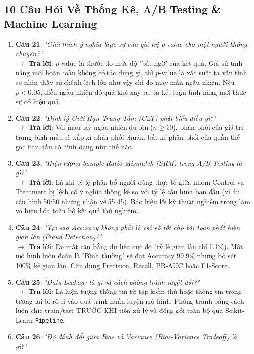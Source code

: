 \subsection{10 Câu Hỏi Về Thống Kê, A/B Testing \& Machine Learning}
\begin{enumerate}
    \item \textbf{Câu 21}: \textit{"Giải thích ý nghĩa thực sự của giá trị p-value cho một người không chuyên?"} \\
    $\rightarrow$ \textbf{Trả lời}: $p$-value là thước đo mức độ "bất ngờ" của kết quả. Giả sử tính năng mới hoàn toàn không có tác dụng gì, thì $p$-value là xác suất ta vẫn tình cờ nhìn thấy sự chênh lệch lớn như vậy chỉ do may mắn ngẫu nhiên. Nếu $p < 0.05$, điều ngẫu nhiên đó quá khó xảy ra, ta kết luận tính năng mới thực sự có hiệu quả.
    \item \textbf{Câu 22}: \textit{"Định lý Giới Hạn Trung Tâm (CLT) phát biểu điều gì?"} \\
    $\rightarrow$ \textbf{Trả lời}: Với mẫu lấy ngẫu nhiên đủ lớn ($n \ge 30$), phân phối của giá trị trung bình mẫu sẽ xấp xỉ phân phối chuẩn, bất kể phân phối của quần thể gốc ban đầu có hình dạng như thế nào.
    \item \textbf{Câu 23}: \textit{"Hiện tượng Sample Ratio Mismatch (SRM) trong A/B Testing là gì?"} \\
    $\rightarrow$ \textbf{Trả lời}: Là khi tỷ lệ phân bổ người dùng thực tế giữa nhóm Control và Treatment bị lệch có ý nghĩa thống kê so với tỷ lệ cấu hình ban đầu (ví dụ cấu hình 50:50 nhưng nhận về 55:45). Báo hiệu lỗi kỹ thuật nghiêm trọng làm vô hiệu hóa toàn bộ kết quả thử nghiệm.
    \item \textbf{Câu 24}: \textit{"Tại sao Accuracy không phải là chỉ số tốt cho bài toán phát hiện gian lận (Fraud Detection)?"} \\
    $\rightarrow$ \textbf{Trả lời}: Do mất cân bằng dữ liệu cực độ (tỷ lệ gian lận chỉ 0.1\%). Một mô hình luôn đoán là "Bình thường" sẽ đạt Accuracy 99.9\% nhưng bỏ sót 100\% kẻ gian lận. Cần dùng Precision, Recall, PR-AUC hoặc F1-Score.
    \item \textbf{Câu 25}: \textit{"Data Leakage là gì và cách phòng tránh tuyệt đối?"} \\
    $\rightarrow$ \textbf{Trả lời}: Là hiện tượng thông tin từ tập kiểm thử hoặc thông tin trong tương lai bị rò rỉ vào quá trình huấn luyện mô hình. Phòng tránh bằng cách luôn chia train/test TRƯỚC KHI tiền xử lý và đóng gói toàn bộ qua Scikit-Learn \texttt{Pipeline}.
    \item \textbf{Câu 26}: \textit{"Độ đánh đổi giữa Bias và Variance (Bias-Variance Tradeoff) là gì?"} \\

\end{enumerate}
